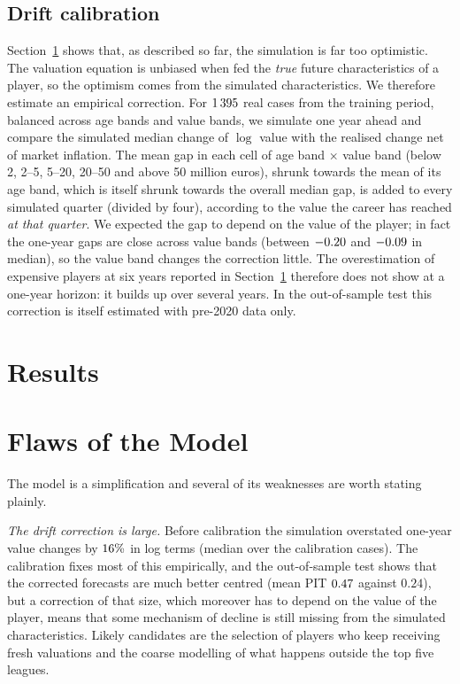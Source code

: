 \documentclass[11pt]{amsart}
\theoremstyle{definition}
\theoremstyle{remark}
\begin{document}
\subsection{Drift calibration}
Section~\ref{sec:results} shows that, as described so far, the simulation is far too optimistic. The valuation equation is unbiased when fed the \emph{true} future characteristics of a player, so the optimism comes from the simulated characteristics. We therefore estimate an empirical correction. For $1\,395$ real cases from the training period, balanced across age bands and value bands, we simulate one year ahead and compare the simulated median change of $\log$ value with the realised change net of market inflation. The mean gap in each cell of age band $\times$ value band (below 2, 2--5, 5--20, 20--50 and above 50 million euros), shrunk towards the mean of its age band, which is itself shrunk towards the overall median gap, is added to every simulated quarter (divided by four), according to the value the career has reached \emph{at that quarter}. We expected the gap to depend on the value of the player; in fact the one-year gaps are close across value bands (between $-0.20$ and $-0.09$ in median), so the value band changes the correction little. The overestimation of expensive players at six years reported in Section~\ref{sec:results} therefore does not show at a one-year horizon: it builds up over several years. In the out-of-sample test this correction is itself estimated with pre-2020 data only.

\section{Results}\label{sec:results}


\section{Flaws of the Model}\label{sec:flaws}

The model is a simplification and several of its weaknesses are worth stating plainly.

\emph{The drift correction is large.} Before calibration the simulation overstated one-year value changes by $16\%$ in log terms (median over the calibration cases). The calibration fixes most of this empirically, and the out-of-sample test shows that the corrected forecasts are much better centred (mean PIT $0.47$ against $0.24$), but a correction of that size, which moreover has to depend on the value of the player, means that some mechanism of decline is still missing from the simulated characteristics. Likely candidates are the selection of players who keep receiving fresh valuations and the coarse modelling of what happens outside the top five leagues.
\end{document}
